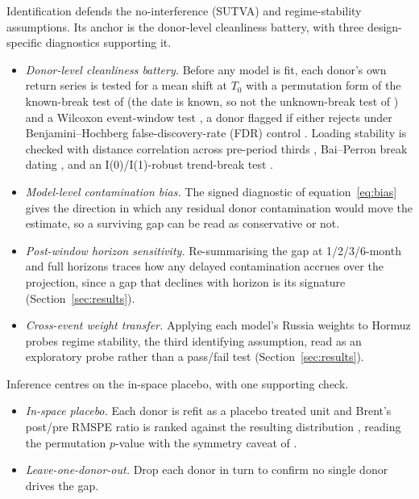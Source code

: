 Identification defends the no-interference (SUTVA) and regime-stability assumptions. Its
anchor is the donor-level cleanliness battery, with three design-specific diagnostics
supporting it.
\begin{itemize}
\item \textit{Donor-level cleanliness battery.} Before any model is fit, each donor's own
return series is tested for a mean shift at $T_0$ with a permutation form of the known-break
test of \citet{chow1960} (the date is known, so not the unknown-break test of
\citet{andrews1993}) and a Wilcoxon event-window test \citep{brownwarner1985}, a donor
flagged if either rejects under Benjamini--Hochberg false-discovery-rate (FDR) control
\citep{benjaminihochberg1995}. Loading stability is checked with distance correlation across
pre-period thirds \citep{szekely2007}, Bai--Perron break dating
\citep{baiperron1998,baiperron2003}, and an I(0)/I(1)-robust trend-break test
\citep{harvey2009,kpss1992}. 
\item \textit{Model-level contamination bias.} The signed diagnostic of
equation~\eqref{eq:bias} gives the direction in which any residual donor contamination would
move the estimate, so a surviving gap can be read as conservative or not.
\item \textit{Post-window horizon sensitivity.} Re-summarising the gap at 1/2/3/6-month and
full horizons traces how any delayed contamination accrues over the projection, since a gap
that declines with horizon is its signature (Section~\ref{sec:results}).
\item \textit{Cross-event weight transfer.} Applying each model's Russia weights to Hormuz
probes regime stability, the third identifying assumption, read as an exploratory probe
rather than a pass/fail test (Section~\ref{sec:results}).
\end{itemize}

Inference centres on the in-space placebo, with one supporting check.
\begin{itemize}
\item \textit{In-space placebo.} Each donor is refit as a placebo treated unit and Brent's
post/pre RMSPE ratio is ranked against the resulting distribution \citep{abadie2010}, reading
the permutation $p$-value with the symmetry caveat of \citet{hahnshi2017}.
\item \textit{Leave-one-donor-out.} Drop each donor in turn to confirm no single donor drives
the gap.
\end{itemize}

